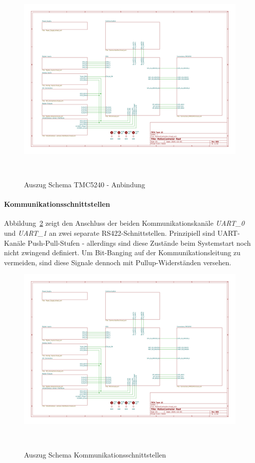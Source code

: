\documentclass[main.  tex]{subfiles} %
\begin{document}
\begin{figure}[h!]
    \centering
    \includegraphics[page=3,width=\textwidth]{../Anhang_pdfs/MotionController.pdf}
    \caption{Auszug Schema TMC5240 - Anbindung}~\label{fig:Schema_TMC5240}
\end{figure}

\paragraph{Kommunikationsschnittstellen}
Abbildung~\ref{fig:Schema_Kommunikation} zeigt den Anschluss der beiden
Kommunikationskanäle \textit{UART_0} und \textit{UART_1} an zwei separate
RS422-Schnittstellen. Prinzipiell sind UART-Kanäle Push-Pull-Stufen -
allerdings sind diese Zustände beim Systemstart noch nicht zwingend definiert.
Um Bit-Banging auf der Kommunikationsleitung zu vermeiden, sind diese Signale
dennoch mit Pullup-Widerständen versehen.

\begin{figure}[h!]
    \centering
    \includegraphics[page=4,width=\textwidth]{../Anhang_pdfs/MotionController.pdf}
    \caption{Auszug Schema Kommunikationsschnittstellen}~\label{fig:Schema_Kommunikation}
\end{figure}
\end{document}
